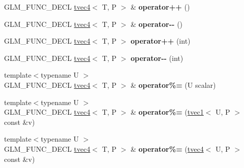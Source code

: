 \begin{DoxyCompactItemize}
\item 
\hypertarget{structglm_1_1tvec4_a19eca55691c4a3e104ae6e82dc329447}{G\-L\-M\-\_\-\-F\-U\-N\-C\-\_\-\-D\-E\-C\-L \hyperlink{structglm_1_1tvec4}{tvec4}$<$ T, P $>$ \& {\bfseries operator++} ()}\label{structglm_1_1tvec4_a19eca55691c4a3e104ae6e82dc329447}

\item 
\hypertarget{structglm_1_1tvec4_a52de40bbc639aef485504c407f4b5712}{G\-L\-M\-\_\-\-F\-U\-N\-C\-\_\-\-D\-E\-C\-L \hyperlink{structglm_1_1tvec4}{tvec4}$<$ T, P $>$ \& {\bfseries operator-\/-\/} ()}\label{structglm_1_1tvec4_a52de40bbc639aef485504c407f4b5712}

\item 
\hypertarget{structglm_1_1tvec4_a727247cb426392cf6275da028a03c721}{G\-L\-M\-\_\-\-F\-U\-N\-C\-\_\-\-D\-E\-C\-L \hyperlink{structglm_1_1tvec4}{tvec4}$<$ T, P $>$ {\bfseries operator++} (int)}\label{structglm_1_1tvec4_a727247cb426392cf6275da028a03c721}

\item 
\hypertarget{structglm_1_1tvec4_a253c3c93df77e74948e86d4820ab7a22}{G\-L\-M\-\_\-\-F\-U\-N\-C\-\_\-\-D\-E\-C\-L \hyperlink{structglm_1_1tvec4}{tvec4}$<$ T, P $>$ {\bfseries operator-\/-\/} (int)}\label{structglm_1_1tvec4_a253c3c93df77e74948e86d4820ab7a22}

\item 
\hypertarget{structglm_1_1tvec4_a02e8a331532d44e052509273241892df}{{\footnotesize template$<$typename U $>$ }\\G\-L\-M\-\_\-\-F\-U\-N\-C\-\_\-\-D\-E\-C\-L \hyperlink{structglm_1_1tvec4}{tvec4}$<$ T, P $>$ \& {\bfseries operator\%=} (U scalar)}\label{structglm_1_1tvec4_a02e8a331532d44e052509273241892df}

\item 
\hypertarget{structglm_1_1tvec4_ac71d67fa398069e9899bf5c420b1cc72}{{\footnotesize template$<$typename U $>$ }\\G\-L\-M\-\_\-\-F\-U\-N\-C\-\_\-\-D\-E\-C\-L \hyperlink{structglm_1_1tvec4}{tvec4}$<$ T, P $>$ \& {\bfseries operator\%=} (\hyperlink{structglm_1_1tvec1}{tvec1}$<$ U, P $>$ const \&v)}\label{structglm_1_1tvec4_ac71d67fa398069e9899bf5c420b1cc72}

\item 
\hypertarget{structglm_1_1tvec4_ae741cd1a5b5495e3cfbefa2721f8c46f}{{\footnotesize template$<$typename U $>$ }\\G\-L\-M\-\_\-\-F\-U\-N\-C\-\_\-\-D\-E\-C\-L \hyperlink{structglm_1_1tvec4}{tvec4}$<$ T, P $>$ \& {\bfseries operator\%=} (\hyperlink{structglm_1_1tvec4}{tvec4}$<$ U, P $>$ const \&v)}\label{structglm_1_1tvec4_ae741cd1a5b5495e3cfbefa2721f8c46f}


\end{DoxyCompactItemize}
